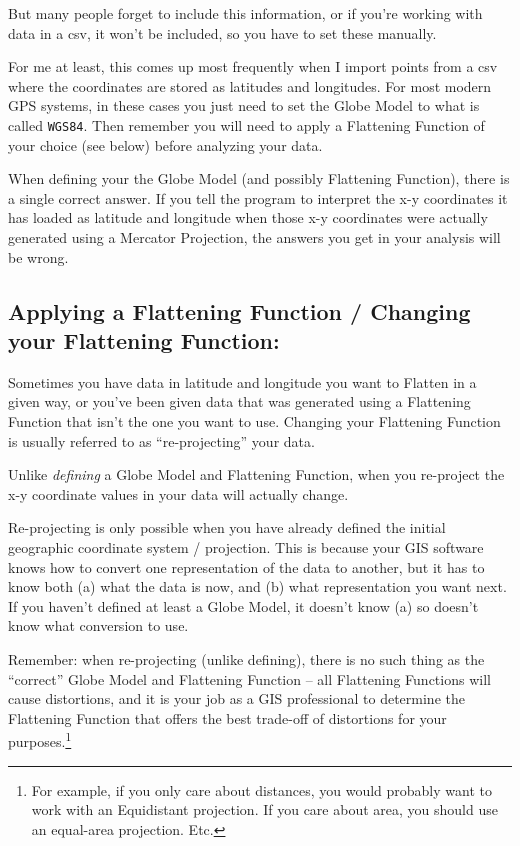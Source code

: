 \documentclass[11pt]{article}
\begin{document}
But many people forget to include this information, or if you're working with data in a csv, it won't be included, so you have to set these manually.

For me at least, this comes up most frequently when I import points from a csv where the coordinates are stored as latitudes and longitudes. For most modern GPS systems, in these cases you just need to set the Globe Model to what is called \texttt{WGS84}. Then remember you will need to apply a Flattening Function of your choice (see below) before analyzing your data.

When defining your the Globe Model (and possibly Flattening Function), {\color{red} there is a single correct answer}. If you tell the program to interpret the x-y coordinates it has loaded as latitude and longitude when those x-y coordinates were actually generated using a Mercator Projection, the answers you get in your analysis will be wrong.

\subsection{Applying a Flattening Function / Changing your Flattening Function:} Sometimes you have data in latitude and longitude you want to Flatten in a given way, or you've been given data that was generated using a Flattening Function that isn't the one you want to use. Changing your Flattening Function is usually referred to as ``re-projecting'' your data.

Unlike \emph{defining} a Globe Model and Flattening Function, when you re-project the x-y coordinate values in your data will actually change.

Re-projecting is only possible when you have already defined the initial geographic coordinate system / projection. This is because your GIS software knows how to convert one representation of the data to another, but it has to know both (a) what the data is now, and (b) what representation you want next. If you haven't defined at least a Globe Model, it doesn't know (a) so doesn't know what conversion to use.

Remember: when re-projecting (unlike defining), there is no such thing as the ``correct'' Globe Model and Flattening Function -- all Flattening Functions will cause distortions, and it is your job as a GIS professional to determine the Flattening Function that offers the best trade-off of distortions for your purposes.\footnote{For example, if you only care about distances, you would probably want to work with an Equidistant projection. If you care about area, you should use an equal-area projection. Etc.}
\end{document}
